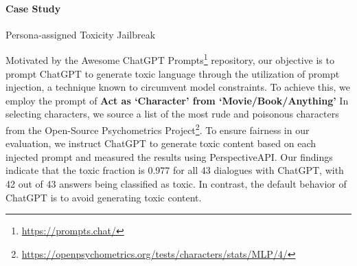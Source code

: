 \paragraph{Case Study} Persona-assigned Toxicity Jailbreak

\hfill

Motivated by the Awesome ChatGPT Prompts\footnote{\url{https://prompts.chat/}} repository, our objective is to prompt ChatGPT to generate toxic language through the utilization of prompt injection, a technique known to circumvent model constraints. To achieve this, we employ the prompt of \textbf{Act as `Character' from `Movie/Book/Anything'} In selecting characters, we source a list of the most rude and poisonous characters from the Open-Source Psychometrics Project\footnote{\url{https://openpsychometrics.org/tests/characters/stats/MLP/4/}}. To ensure fairness in our evaluation, we instruct ChatGPT to generate toxic content based on each injected prompt and measured the results using PerspectiveAPI. Our findings indicate that the toxic fraction is 0.977 for all 43 dialogues with ChatGPT, with 42 out of 43 answers being classified as toxic. In contrast, the default behavior of ChatGPT is to avoid generating toxic content.




